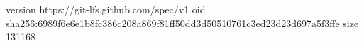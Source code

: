 version https://git-lfs.github.com/spec/v1
oid sha256:6989f6e6e1b8fc386c208a869f81ff50dd3d50510761c3ed23d23d697a5f3ffe
size 131168
